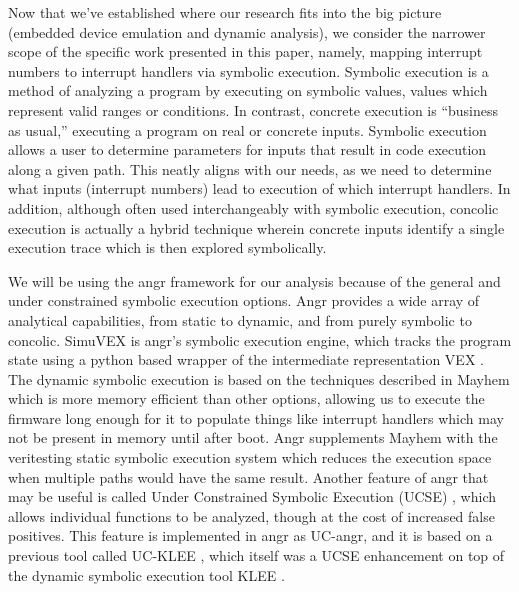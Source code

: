 \documentclass[letterpaper, 10 pt, conference]{ieeeconf}
\begin{document}
Now that we’ve established where our research fits into the big picture (embedded device emulation and dynamic analysis), we consider the narrower scope of the specific work presented in this paper, namely, mapping interrupt numbers to interrupt handlers via symbolic execution. Symbolic execution \cite{jking} is a method of analyzing a program by executing on symbolic values, values which represent valid ranges or conditions. In contrast, concrete execution is “business as usual,” executing a program on real or concrete inputs. Symbolic execution allows a user to determine parameters for inputs that result in code execution along a given path. This neatly aligns with our needs, as we need to determine what inputs (interrupt numbers) lead to execution of which interrupt handlers. In addition, although often used interchangeably with symbolic execution, concolic execution \cite{ksen} is actually a hybrid technique wherein concrete inputs identify a single execution trace which is then explored symbolically. 

We will be using the angr framework \cite{angr} for our analysis because of the general and under constrained symbolic execution options. Angr provides a wide array of analytical capabilities, from static to dynamic, and from purely symbolic to concolic. SimuVEX is angr’s symbolic execution engine, which tracks the program state using a python based wrapper \cite{pyvex} of the intermediate representation VEX \cite{vex}. The dynamic symbolic execution is based on the techniques described in Mayhem \cite{mayhem} which is more memory efficient than other options, allowing us to execute the firmware long enough for it to populate things like interrupt handlers which may not be present in memory until after boot. Angr supplements Mayhem with the veritesting static symbolic execution system \cite{veritesting} which reduces the execution space when multiple paths would have the same result. Another feature of angr that may be useful is called Under Constrained Symbolic Execution (UCSE) \cite{ucklee2}, which allows individual functions to be analyzed, though at the cost of increased false positives. This feature is implemented in angr as UC-angr, and it is based on a previous tool called UC-KLEE \cite{ucklee1}, which itself was a UCSE enhancement on top of the dynamic symbolic execution tool KLEE \cite{klee}.

{}

\end{document}
